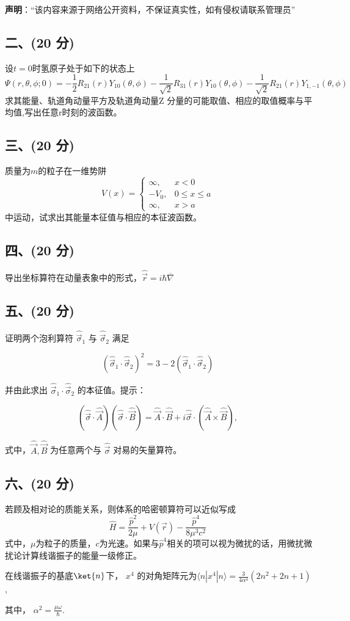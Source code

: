 
\textbf{声明}：“该内容来源于网络公开资料，不保证真实性，如有侵权请联系管理员”

\subsection{二、(20 分)}
设$t=0$时氢原子处于如下的状态上
$$\Psi(r, \theta, \phi; 0) = -\frac{1}{2} R_{21}(r) Y_{10} (\theta, \phi) - \frac{1}{\sqrt{2}} R_{31}(r) Y_{10} (\theta, \phi) - \frac{1}{\sqrt{2}} R_{21}(r) Y_{1,-1} (\theta, \phi)~$$
求其能量、轨道角动量平方及轨道角动量Z 分量的可能取值、相应的取值概率与平均值,写出任意r时刻的波函数。
\subsection{三、(20 分)}
质量为$m$的粒子在一维势阱
\[
V(x) = \begin{cases} 
\infty, & x < 0 \\
-V_0, & 0 \leq x \leq a \\
\infty, & x > a
\end{cases}~
\] 
中运动，试求出其能量本征值与相应的本征波函数。
\subsection{四、(20 分)}
导出坐标算符在动量表象中的形式，$\hat{\vec{r}} = i\hbar\overline{\nabla}$
\subsection{五、(20 分)}
证明两个泡利算符 $\hat{\vec{\sigma}}_1$ 与 $\hat{\vec{\sigma}}_2$ 满足

$$(\hat{\vec{\sigma}}_1 \cdot \hat{\vec{\sigma}}_2)^2 = 3 - 2 (\hat{\vec{\sigma}}_1 \cdot \hat{\vec{\sigma}}_2)~$$

并由此求出 $\hat{\vec{\sigma}}_1 \cdot \hat{\vec{\sigma}}_2$ 的本征值。提示：

$$ \left( \hat{\vec{\sigma}} \cdot \hat{\vec{A}} \right) \left( \hat{\vec{\sigma}} \cdot \hat{\vec{B}} \right) = \hat{\vec{A}} \cdot \hat{\vec{B}} + i \hat{\vec{\sigma}} \cdot (
\hat{\vec{A}} \times \hat{\vec{B}}), ~$$

式中，$\hat{\vec{A}}, \hat{\vec{B}}$ 为任意两个与 $\hat{\vec{\sigma}}$ 对易的矢量算符。
\subsection{六、(20 分)}
若顾及相对论的质能关系，则体系的哈密顿算符可以近似写成
$$\hat{H}=\frac{\hat{p}^2}{2\mu}+V(\vec{r})-\frac{\hat{p}^4}{8\mu^3c^2}~$$
式中，$\mu$为粒子的质量，$c$为光速。如果与$\hat{p}^4$相关的项可以视为微扰的话，用微扰微扰论计算线谐振子的能量一级修正。

在线谐振子的基底$\ket{n}$下， $x^4$ 的对角矩阵元为$\langle n|x^4|n\rangle = \frac{3}{4\alpha^4} \left(2n^2 + 2n + 1 \right)$, 

其中， $\alpha^2 = \frac{\mu\omega}{\hbar}$.